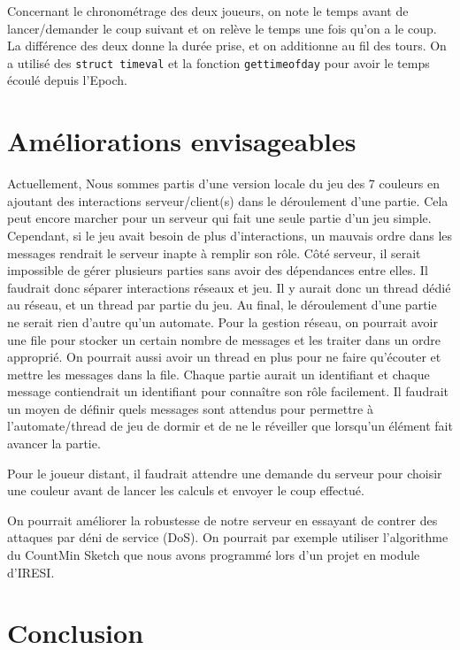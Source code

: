 \documentclass[a4paper]{article}
\begin{document}
Concernant le chronométrage des deux joueurs, on note le temps avant de 
lancer/demander le coup suivant et on relève le temps une fois qu'on a le 
coup. La différence des deux donne la durée prise, et on additionne au fil des 
tours. On a utilisé des \texttt{struct timeval} et la fonction 
\texttt{gettimeofday} pour avoir le temps écoulé depuis l'Epoch.



\section{Améliorations envisageables}

Actuellement, Nous sommes partis d'une version locale du jeu des 7 couleurs en ajoutant
des interactions serveur/client(s) dans le déroulement d'une partie. Cela peut
encore marcher pour un serveur qui fait une seule partie d'un jeu simple.
Cependant, si le jeu avait besoin de plus d'interactions, un mauvais ordre dans
les messages rendrait le serveur inapte à remplir son rôle. Côté serveur, il serait impossible de
gérer plusieurs parties sans avoir des dépendances entre elles. Il faudrait donc
séparer interactions réseaux et jeu. Il y aurait donc un thread dédié au réseau,
et un thread par partie du jeu. Au final, le déroulement d'une partie ne serait
rien d'autre qu'un automate. Pour la gestion réseau, on pourrait avoir une file
pour stocker un certain nombre de messages et les traiter dans un ordre
approprié. On pourrait aussi avoir un thread en plus pour ne faire qu'écouter et
mettre les messages dans la file. Chaque partie aurait un identifiant et chaque
message contiendrait un identifiant pour connaître son rôle facilement. Il
faudrait un moyen de définir quels messages sont attendus pour permettre à
l'automate/thread de jeu de dormir et de ne le réveiller que lorsqu'un élément
fait avancer la partie.


Pour le joueur distant, il faudrait attendre une demande du serveur pour choisir 
une couleur avant de lancer les calculs et envoyer le coup effectué.

On pourrait améliorer la robustesse de notre serveur en essayant de contrer des 
attaques par déni de service (DoS). On pourrait par exemple utiliser 
l'algorithme du CountMin Sketch que nous avons programmé lors d'un projet en 
module d'IRESI.


\section*{Conclusion}
\end{document}
